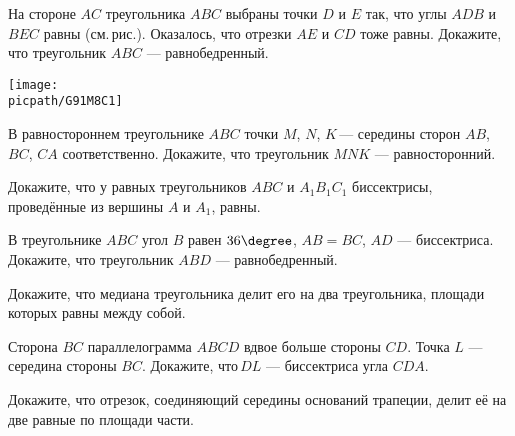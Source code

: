 \begin{consultation}
	\begin{listofex}
		\item \begin{minipage}[t]{\bodywidth}
			На стороне \( AC \) треугольника \( ABC \) выбраны точки \( D \) и \( E \) так, что углы \( ADB \) и \( BEC \) равны (см. рис.). Оказалось, что отрезки \( AE \) и \( CD \) тоже равны. Докажите, что треугольник \( ABC \) --- равнобедренный.
		\end{minipage}
		\gapwidth
		\begin{minipage}[t]{\picwidth}
			\texttt{[image: \\picpath/G91M8C1]}
		\end{minipage}
		\item В равностороннем треугольнике \( ABC \) точки \( M \), \( N \), \( K \) --- середины сторон \( AB \), \( BC \), \( CA \) соответственно. Докажите, что треугольник \( MNK \) --- равносторонний.
		\item Докажите, что у равных треугольников \( ABC \) и \( A_1B_1C_1 \) биссектрисы, проведённые из вершины  \( A \) и \( A_1 \), равны.
		\item В треугольнике \( ABC \) угол \( B \) равен \( 36\degree \), \( AB=BC \), \( AD \) --- биссектриса. Докажите, что треугольник \( ABD \) --- равнобедренный.
		\item Докажите, что медиана треугольника делит его на два треугольника, площади которых равны между собой.
		\item Сторона \( BC \) параллелограмма \( ABCD \) вдвое больше стороны \( CD \). Точка \( L \) --- середина стороны \( BC \). Докажите, что \( DL \) --- биссектриса угла \( CDA \).
		\item Докажите, что отрезок, соединяющий середины оснований трапеции, делит её на две равные по площади части.
	\end{listofex}
\end{consultation}
